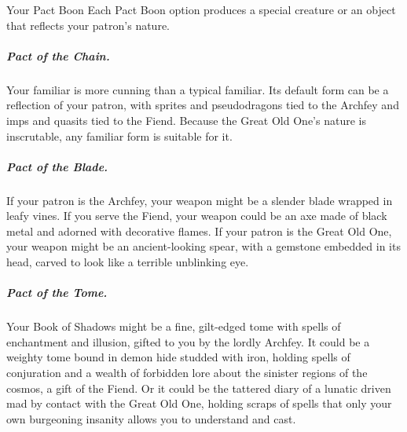 \begin{DndComment}{Your Pact Boon}
    Each Pact Boon option produces a special creature or an object that reflects your patron's nature.
    
    \subparagraph*{Pact of the Chain.} Your familiar is more cunning than a typical familiar. Its default form can be a reflection of your patron, with sprites and pseudodragons tied to the Archfey and imps and quasits tied to the Fiend. Because the Great Old One's nature is inscrutable, any familiar form is suitable for it.
    
    \subparagraph*{Pact of the Blade.} If your patron is the Archfey, your weapon might be a slender blade wrapped in leafy vines. If you serve the Fiend, your weapon could be an axe made of black metal and adorned with decorative flames. If your patron is the Great Old One, your weapon might be an ancient-looking spear, with a gemstone embedded in its head, carved to look like a terrible unblinking eye.
    
    \subparagraph*{Pact of the Tome.} Your Book of Shadows might be a fine, gilt-edged tome with spells of enchantment and illusion, gifted to you by the lordly Archfey. It could be a weighty tome bound in demon hide studded with iron, holding spells of conjuration and a wealth of forbidden lore about the sinister regions of the cosmos, a gift of the Fiend. Or it could be the tattered diary of a lunatic driven mad by contact with the Great Old One, holding scraps of spells that only your own burgeoning insanity allows you to understand and cast.    
\end{DndComment}
